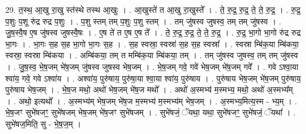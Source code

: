 \documentclass[17pt]{extarticle}
\begin{document}
29. त॒स्थ॒ आ॒खु रा॒खु स्त॑स्थे तस्थ आ॒खुः । . आ॒खुस्ते॑ त आ॒खु रा॒खुस्ते᳚ । . ते॒ रु॒द्र॒ रु॒द्र॒ ते॒ ते॒ रु॒द्र॒ । . रु॒द्र॒ प॒शुः प॒शू रु॑द्र रुद्र प॒शुः । . प॒शु स्तम् तम् प॒शुः प॒शु स्तम् । . तम् जु॑षस्व जुषस्व॒ तम् तम् जु॑षस्व । . जु॒ष॒स्वै॒ष ए॒ष जु॑षस्व जुषस्वै॒षः । . ए॒ष ते॑ त ए॒ष ए॒ष ते᳚ । . ते॒ रु॒द्र॒ रु॒द्र॒ ते॒ ते॒ रु॒द्र॒ । . रु॒द्र॒ भा॒गो भा॒गो रु॑द्र रुद्र भा॒गः । . भा॒गः स॒ह स॒ह भा॒गो भा॒गः स॒ह । . स॒ह स्वस्रा॒ स्वस्रा॑ स॒ह स॒ह स्वस्रा᳚ । . स्वस्रा म्बि॑क॒या म्बि॑कया॒ स्वस्रा॒ स्वस्रा म्बि॑कया । . अम्बि॑कया॒ तम् त मम्बि॑क॒या म्बि॑कया॒ तम् । . तम् जु॑षस्व जुषस्व॒ तम् तम् जु॑षस्व । . जु॒ष॒स्व॒ भे॒ष॒जम् भे॑ष॒जम् जु॑षस्व जुषस्व भेष॒जम् । . भे॒ष॒जम् गवे॒ गवे॑ भेष॒जम् भे॑ष॒जम् गवे᳚ । . गवे ऽश्वा॒या श्वा॑य॒ गवे॒ गवे ऽश्वा॑य । . अश्वा॑य॒ पुरु॑षाय॒ पुरु॑षा॒या श्वा॒या श्वा॑य॒ पुरु॑षाय । . पुरु॑षाय भेष॒जम् भे॑ष॒जम् पुरु॑षाय॒ पुरु॑षाय भेष॒जम् । . भे॒ष॒ज मथो॒ अथो॑ भेष॒जम् भे॑ष॒ज मथो᳚ । . अथो॑ अ॒स्मभ्य॑ म॒स्मभ्य॒ मथो॒ अथो॑ अ॒स्मभ्य᳚म् । . अथो॒ इत्यथो᳚ । . अ॒स्मभ्य॑म् भेष॒जम् भे॑ष॒ज म॒स्मभ्य॑ म॒स्मभ्य॑म् भेष॒जम् । . अ॒स्मभ्य॒मित्य॒स्म - भ्य॒म् । . भे॒ष॒जꣳ सुभे॑षजꣳ॒॒ सुभे॑षजम् भेष॒जम् भे॑ष॒जꣳ सुभे॑षजम् । . सुभे॑षजं॒ ॅयथा॒ यथा॒ सुभे॑षजꣳ॒॒ सुभे॑षजं॒ ॅयथा᳚ । . सुभे॑षज॒मिति॒ सु - भे॒ष॒ज॒म् । \newline
\end{document}

